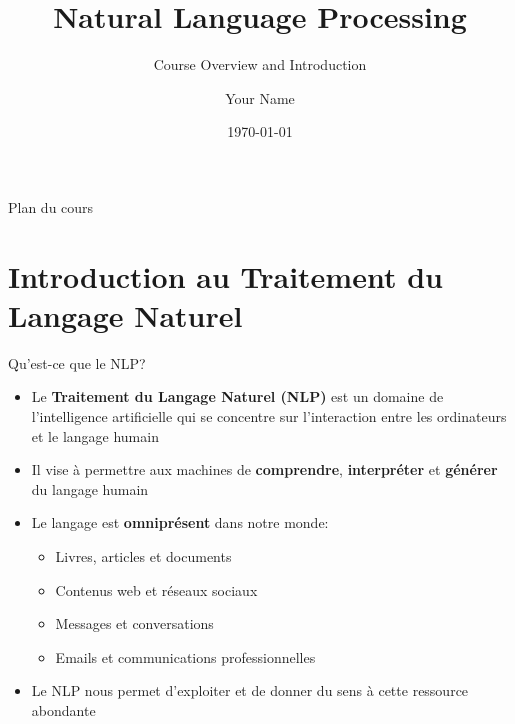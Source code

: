 \documentclass[aspectratio=169,11pt]{beamer}
\title{Natural Language Processing}
\subtitle{Course Overview and Introduction}
\author{Your Name}
\institute{Your Institution}
\date{\today}
\begin{document}
\begin{frame}
    \titlepage
\end{frame}

\begin{frame}{Plan du cours}
    \tableofcontents
\end{frame}

\section{Introduction au Traitement du Langage Naturel}

\begin{frame}{Qu'est-ce que le NLP?}

    \begin{itemize}
        \item Le \textbf{Traitement du Langage Naturel (NLP)} est un domaine de l'intelligence artificielle qui se concentre sur l'interaction entre les ordinateurs et le langage humain
        \item Il vise à permettre aux machines de \textbf{comprendre}, \textbf{interpréter} et \textbf{générer} du langage humain
        \item Le langage est \textbf{omniprésent} dans notre monde:
        \begin{itemize}
            \item Livres, articles et documents
            \item Contenus web et réseaux sociaux
            \item Messages et conversations
            \item Emails et communications professionnelles
        \end{itemize}
        \item Le NLP nous permet d'exploiter et de donner du sens à cette ressource abondante
    \end{itemize}

\end{frame}
\end{document}
